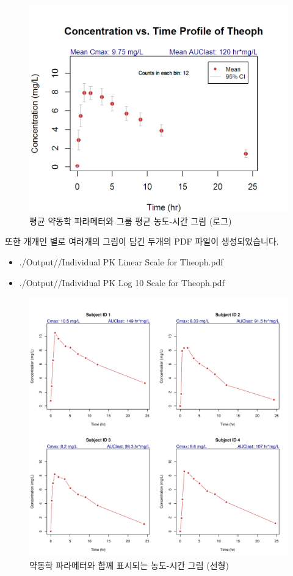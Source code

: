 \documentclass[12pt,]{krantz}
\providecommand{\tightlist}{%
  \setlength{\itemsep}{0pt}\setlength{\parskip}{0pt}}
\theoremstyle{definition}
\theoremstyle{definition}
\theoremstyle{definition}
\theoremstyle{remark}
\begin{document}
\begin{figure}
\includegraphics[width=13.89in]{Output/PK_Profile_with_CI_for_Theoph} \caption{평균 약동학 파라메터와 그룹 평균 농도-시간 그림 (로그)}\label{fig:unnamed-chunk-21}
\end{figure}

또한 개개인 별로 여러개의 그림이 담긴 두개의 PDF 파일이 생성되었습니다.

\begin{itemize}
\tightlist
\item
  ./Output//Individual PK Linear Scale for Theoph.pdf
\item
  ./Output//Individual PK Log 10 Scale for Theoph.pdf
\end{itemize}

\begin{figure}
\includegraphics[width=41.67in]{Output/Individual_PK_Linear_Scale_for_Theoph00} \caption{약동학 파라메터와 함께 표시되는 농도-시간 그림 (선형)}\label{fig:unnamed-chunk-22}
\end{figure}
\end{document}
